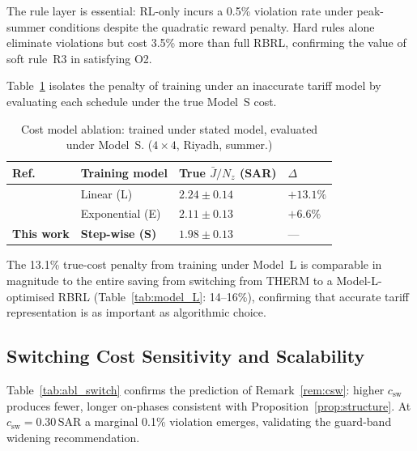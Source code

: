 \documentclass[12pt,a4paper]{article}
\let\oldsubsection\subsection
\renewcommand{\subsection}[1]{\FloatBarrier\oldsubsection{#1}}
\newcommand{\csw}{c_{\mathrm{sw}}}
\newcommand{\Jbar}{\bar{J}}
\newcommand{\SAR}{\text{SAR}}
\begin{document}
The rule layer is essential: RL-only incurs a 0.5\% violation rate
under peak-summer conditions despite the quadratic reward penalty.
Hard rules alone eliminate violations but cost 3.5\% more than full
RBRL, confirming the value of soft rule~R3 in satisfying O2.

Table~\ref{tab:abl_cost} isolates the penalty of training under an
inaccurate tariff model by evaluating each schedule under the true
Model~S cost.

\begin{table}[!t]
\centering
\caption{Cost model ablation: trained under stated model, evaluated
under Model~S. ($4\times4$, Riyadh, summer.)}
\label{tab:abl_cost}

\setlength{\tabcolsep}{6pt} %

\begin{tabularx}{\linewidth}{
>{\raggedright\arraybackslash}X   %
>{\raggedright\arraybackslash}X   %
>{\centering\arraybackslash}X     %
>{\centering\arraybackslash}X     %
}
\toprule
Ref. & Training model & True $\Jbar/N_z$ (SAR) & $\Delta$ \\
\midrule
\cite{ElMakroum2023,Gonçalves2022} & Linear (L)      & $2.24{\pm}0.14$ & $+13.1\%$ \\
\cite{Risbeck2017} & Exponential (E) & $2.11{\pm}0.13$ & $+6.6\%$  \\
\textbf{This work} & \textbf{Step-wise (S)} & $\mathbf{1.98{\pm}0.13}$ & --- \\
\bottomrule
\end{tabularx}
\end{table}

The 13.1\% true-cost penalty from training under Model~L is comparable
in magnitude to the entire saving from switching from THERM to a
Model-L-optimised RBRL (Table~\ref{tab:model_L}: 14--16\%),
confirming that accurate tariff representation is as important as
algorithmic choice.

\subsection{Switching Cost Sensitivity and Scalability}
\label{subsec:abl_cost}

Table~\ref{tab:abl_switch} confirms the prediction of
Remark~\ref{rem:csw}: higher $\csw$ produces fewer, longer on-phases
consistent with Proposition~\ref{prop:structure}.
At $\csw=0.30\,\SAR$ a marginal 0.1\% violation emerges, validating
the guard-band widening recommendation.
\end{document}
